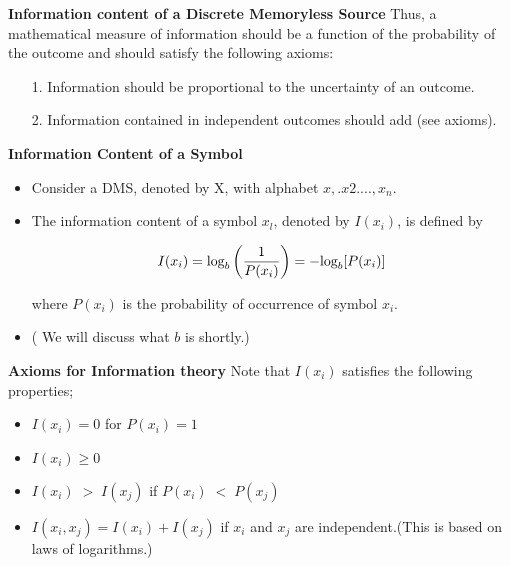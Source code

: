 \documentclass[]{article}
\begin{document}

\noindent \textbf{Information content of a Discrete Memoryless Source}
Thus, a mathematical measure of information should be a function of the probability of the outcome and should satisfy the following axioms:
\begin{itemize}
\item[1.] Information should be proportional to the uncertainty of an outcome.
\item[2.] Information contained in independent outcomes should add (see axioms).
\end{itemize}



\noindent \textbf{Information Content of a Symbol}
\vspace{-1cm}
\begin{itemize}
\item Consider a DMS, denoted by X, with alphabet ${x,.x2. ...,x_n}$.
\item The information content of a symbol
$x_l$, denoted by $I(x_i)$, is defined by

\[  I(x_i)  = \mbox{log}_b\left({1 \over P(x_i)}\right) =  -\mbox{log}_b[ P(x_i) ]  \]


where $P(x_i)$ is the probability of occurrence of symbol $x_i$. \item ( We will discuss what $b$ is shortly.)
\end{itemize}




\noindent \textbf{Axioms for Information theory}
Note that $I(x_i)$ satisfies the following properties;
\begin{itemize}
\item $I(x_i) = 0 $ for $P(x_i) = 1$ %
\item $I(x_i) \geq 0 $
\item $I(x_i) \; >\; I(x_j)$  if $P(x_i)\; < \; P(x_j)$
\item $I(x_i, x_j)  = I(x_i) + I(x_j)$ if $x_i$ and $x_j$ are independent.(This is based on laws of logarithms.)
\end{itemize}
\end{document}
